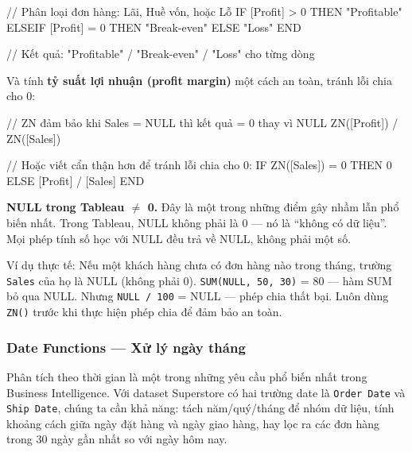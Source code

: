 \documentclass[12pt]{article}
\begin{document}
\begin{aivncodebox}[]
\begin{python}
// Phân loại đơn hàng: Lãi, Huề vốn, hoặc Lỗ
IF [Profit] > 0 THEN "Profitable"
ELSEIF [Profit] = 0 THEN "Break-even"
ELSE "Loss"
END

// Kết quả: "Profitable" / "Break-even" / "Loss" cho từng dòng
\end{python}
\end{aivncodebox}

\noindent Và tính \textbf{tỷ suất lợi nhuận (profit margin)} một cách an toàn, tránh lỗi chia cho 0:

\begin{aivncodebox}[]
\begin{python}
// ZN đảm bảo khi Sales = NULL thì kết quả = 0 thay vì NULL
ZN([Profit]) / ZN([Sales])

// Hoặc viết cẩn thận hơn để tránh lỗi chia cho 0:
IF ZN([Sales]) = 0 THEN 0
ELSE [Profit] / [Sales]
END
\end{python}
\end{aivncodebox}

\begin{notebox}
\textbf{NULL trong Tableau $\neq$ 0.} Đây là một trong những điểm gây nhầm lẫn phổ biến nhất. Trong Tableau, NULL không phải là 0 --- nó là ``không có dữ liệu''. Mọi phép tính số học với NULL đều trả về NULL, không phải một số.

\noindent Ví dụ thực tế: Nếu một khách hàng chưa có đơn hàng nào trong tháng, trường \texttt{Sales} của họ là NULL (không phải 0). \texttt{SUM(NULL, 50, 30)} = 80 --- hàm SUM bỏ qua NULL. Nhưng \texttt{NULL / 100} = NULL --- phép chia thất bại. Luôn dùng \texttt{ZN()} trước khi thực hiện phép chia để đảm bảo an toàn.
\end{notebox}

\subsubsection{Date Functions --- Xử lý ngày tháng}

\noindent Phân tích theo thời gian là một trong những yêu cầu phổ biến nhất trong Business Intelligence. Với dataset Superstore có hai trường date là \texttt{Order Date} và \texttt{Ship Date}, chúng ta cần khả năng: tách năm/quý/tháng để nhóm dữ liệu, tính khoảng cách giữa ngày đặt hàng và ngày giao hàng, hay lọc ra các đơn hàng trong 30 ngày gần nhất so với ngày hôm nay.
\end{document}
